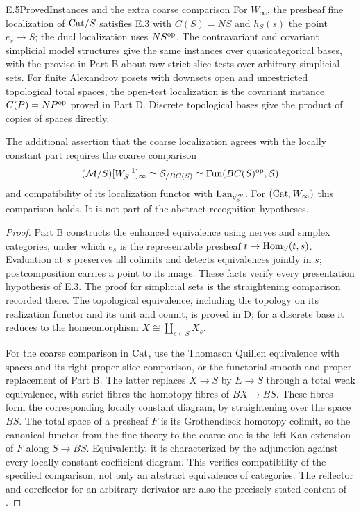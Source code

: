 \begin{claim}{E.5}{Proved}{Instances and the extra coarse comparison}
For $W_\infty$, the presheaf fine localization of $\mathrm{Cat}/S$ satisfies E.3 with $C(S)=NS$ and $h_S(s)$ the point $e_s\to S$; the dual localization uses $NS^{\mathrm{op}}$. The contravariant and covariant simplicial model structures give the same instances over quasicategorical bases, with the proviso in Part B about raw strict slice tests over arbitrary simplicial sets. For finite Alexandrov posets with downsets open and unrestricted topological total spaces, the open-test localization is the covariant instance $C(P)=NP^{\mathrm{op}}$ proved in Part D. Discrete topological bases give the product of copies of spaces directly.

The additional assertion that the coarse localization agrees with the locally constant part requires the coarse comparison
\[
 (\mathcal M/S)[W_S^{-1}]_\infty\simeq\mathcal S_{/BC(S)}
 \simeq\mathrm{Fun}(BC(S)^{\mathrm{op}},\mathcal S)
\]
and compatibility of its localization functor with $\mathrm{Lan}_{q_S^{\mathrm{op}}}$. For $(\mathrm{Cat},W_\infty)$ this comparison holds. It is not part of the abstract recognition hypotheses.
\end{claim}
\begin{proof}
Part B constructs the enhanced equivalence using nerves and simplex categories, under which $e_s$ is the representable presheaf $t\mapsto\mathrm{Hom}_S(t,s)$. Evaluation at $s$ preserves all colimits and detects equivalences jointly in $s$; postcomposition carries a point to its image. These facts verify every presentation hypothesis of E.3. The proof for simplicial sets is the straightening comparison recorded there. The topological equivalence, including the topology on its realization functor and its unit and counit, is proved in D; for a discrete base it reduces to the homeomorphism $X\cong\coprod_{s\in S}X_s$.

For the coarse comparison in $\mathrm{Cat}$, use the Thomason Quillen equivalence with spaces and its right proper slice comparison, or the functorial smooth-and-proper replacement of Part B. The latter replaces $X\to S$ by $E\to S$ through a total weak equivalence, with strict fibres the homotopy fibres of $BX\to BS$. These fibres form the corresponding locally constant diagram, by straightening over the space $BS$. The total space of a presheaf $F$ is its Grothendieck homotopy colimit, so the canonical functor from the fine theory to the coarse one is the left Kan extension of $F$ along $S\to BS$. Equivalently, it is characterized by the adjunction against every locally constant coefficient diagram. This verifies compatibility of the specified comparison, not only an abstract equivalence of categories. The reflector and coreflector for an arbitrary derivator are also the precisely stated content of \citet[Theorem 3.13]{EFCisinski2009}.
\end{proof}

